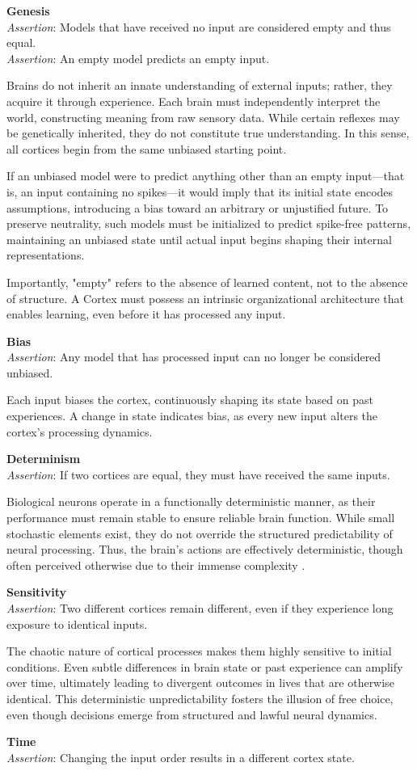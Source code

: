 \documentclass{article}
\newcommand{\agitbtest}[2]{
 \item \textbf{#1} \\
 #2
}
\begin{document}
\begin{agitblist}
\agitbtest{Genesis}{
\emph{Assertion}: Models that have received no input are considered empty and thus equal.\\
\emph{Assertion}: An empty model predicts an empty input.

Brains do not inherit an innate understanding of external inputs; rather, they acquire it through experience. Each brain must independently interpret the world, constructing meaning from raw sensory data. While certain reflexes may be genetically inherited, they do not constitute true understanding. In this sense, all cortices begin from the same unbiased starting point.

If an unbiased model were to predict anything other than an empty input—that is, an input containing no spikes—it would imply that its initial state encodes assumptions, introducing a bias toward an arbitrary or unjustified future. To preserve neutrality, such models must be initialized to predict spike-free patterns, maintaining an unbiased state until actual input begins shaping their internal representations.

Importantly, "empty" refers to the absence of learned content, not to the absence of structure. A Cortex must possess an intrinsic organizational architecture that enables learning, even before it has processed any input.
}
\agitbtest{Bias}{
\emph{Assertion}: Any model that has processed input can no longer be considered unbiased.

Each input biases the cortex, continuously shaping its state based on past experiences. A change in state indicates bias, as every new input alters the cortex's processing dynamics.
}
\agitbtest{Determinism}{
\emph{Assertion}: If two cortices are equal, they must have received the same inputs.

Biological neurons operate in a functionally deterministic manner, as their performance must remain stable to ensure reliable brain function. While small stochastic elements exist, they do not override the structured predictability of neural processing. Thus, the brain's actions are effectively deterministic, though often perceived otherwise due to their immense complexity \cite{AtlanticFreeWill}.
}
\agitbtest{Sensitivity}{
\emph{Assertion}: Two different cortices remain different, even if they experience long exposure to identical inputs.

The chaotic nature of cortical processes makes them highly sensitive to initial conditions. Even subtle differences in brain state or past experience can amplify over time, ultimately leading to divergent outcomes in lives that are otherwise identical. This deterministic unpredictability fosters the illusion of free choice, even though decisions emerge from structured and lawful neural dynamics.
}
\agitbtest{Time}{
\emph{Assertion}: Changing the input order results in a different cortex state.

}
\end{agitblist}
\end{document}
